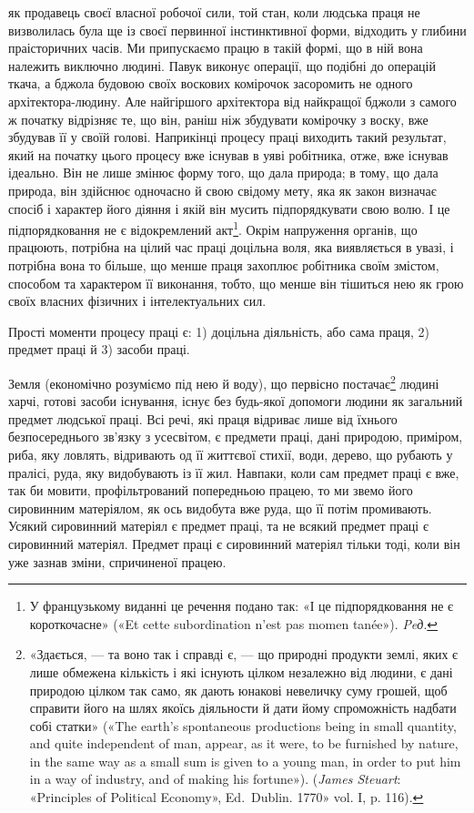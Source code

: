 \parcont{}  %
як продавець своєї власної робочої сили, той стан, коли людська
праця не визволилась була ще із своєї первинної інстинктивної
форми, відходить у глибини праісторичних часів. Ми припускаємо
працю в такій формі, що в ній вона належить виключно людині.
Павук виконує операції, що подібні до операцій ткача, а бджола
будовою своїх воскових комірочок засоромить не одного архітектора-людину.
Але найгіршого архітектора від найкращої
бджоли з самого ж початку відрізняє те, що він, раніш ніж збудувати
комірочку з воску, вже збудував її у своїй голові. Наприкінці
процесу праці виходить такий результат, який на початку
цього процесу вже існував в уяві робітника, отже, вже
існував ідеально. Він не лише змінює форму того, що дала природа;
в тому, що дала природа, він здійснює одночасно й свою
свідому мету, яка як закон визначає спосіб і характер його діяння
і якій він мусить підпорядкувати свою волю. І це підпорядковання
не є відокремлений акт\footnote*{
У французькому виданні це речення подано так: «І це підпорядковання
не є короткочасне» («Et cette subordination n’est pas momen
tanée»). \emph{Peд}.
}. Окрім напруження органів, що працюють,
потрібна на цілий час праці доцільна воля, яка виявляється
в увазі, і потрібна вона то більше, що менше праця захоплює
робітника своїм змістом, способом та характером її виконання,
тобто, що менше він тішиться нею як грою своїх власних
фізичних і інтелектуальних сил.

Прості моменти процесу праці є: 1) доцільна діяльність, або
сама праця, 2) предмет праці й 3) засоби праці.

Земля (економічно розуміємо під нею й воду), що первісно
постачає\footnote{«Здається, — та воно так і справді є, — що природні продукти
землі, яких є лише обмежена кількість і які існують цілком незалежно
від людини, є дані природою цілком так само, як дають юнакові невеличку
суму грошей, щоб справити його на шлях якоїсь діяльности й дати йому
спроможність надбати собі статки» («The earth’s spontaneous productions
being in small quantity, and quite independent of man, appear,
as it were, to be furnished by nature, in the same way as a small sum is given
to a young man, in order to put him in a way of industry, and of making
his fortune»). (\emph{James Steuart}: «Principles of Political Economy», Ed.~Dublin. 1770» vol. I, p. 116).}
людині харчі, готові засоби існування, існує без будь-якої
допомоги людини як загальний предмет людської праці.
Всі речі, які праця відриває лише від їхнього безпосереднього
зв’язку з усесвітом, є предмети праці, дані природою, приміром,
риба, яку ловлять, відривають од її життєвої стихії, води, дерево,
що рубають у пралісі, руда, яку видобувають із її жил. Навпаки, коли сам предмет праці є вже, так би мовити, профільтрований
попередньою працею, то ми звемо його сировинним матеріялом,
як ось видобута вже руда, що її потім промивають. Усякий сировинний
матеріял є предмет праці, та не всякий предмет праці є
сировинний матеріял. Предмет праці є сировинний матеріял тільки
тоді, коли він уже зазнав зміни, спричиненої працею.

